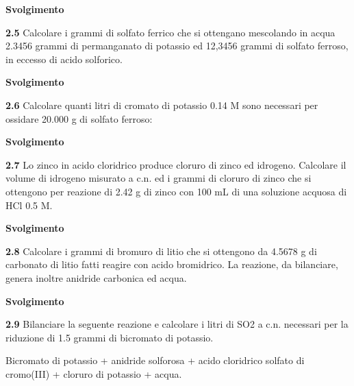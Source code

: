 \large\textbf{Svolgimento}\normalsize

\vspace{0.2cm}

\vspace{0.2cm}\textbf{2.5} Calcolare i grammi di solfato ferrico che si ottengano mescolando in acqua 2.3456 grammi di permanganato di potassio  ed 12,3456 grammi di solfato ferroso, in eccesso di acido solforico.

\large\textbf{Svolgimento}\normalsize

\vspace{0.2cm}

\vspace{0.2cm}\textbf{2.6} Calcolare quanti litri di cromato di potassio 0.14 M sono necessari per ossidare 20.000 g di solfato ferroso:
\begin{center}

\end{center}

\large\textbf{Svolgimento}\normalsize

\vspace{0.2cm}

\vspace{0.2cm}\textbf{2.7} Lo zinco in acido cloridrico produce cloruro di zinco ed idrogeno. Calcolare il volume di
idrogeno misurato a c.n. ed i grammi di cloruro di zinco che si ottengono per reazione di 2.42 g di
zinco con 100 mL di una soluzione acquosa di HCl 0.5 M.

\large\textbf{Svolgimento}\normalsize

\vspace{0.2cm}

\vspace{0.2cm}\textbf{2.8} Calcolare i grammi di bromuro di litio che si ottengono da 4.5678 g di carbonato di litio fatti
reagire con acido bromidrico. La reazione, da bilanciare, genera inoltre anidride carbonica ed acqua.

\large\textbf{Svolgimento}\normalsize

\vspace{0.2cm}

\vspace{0.2cm}\textbf{2.9} Bilanciare la seguente reazione e calcolare i litri di SO2 a c.n. necessari per la riduzione di 1.5
grammi di bicromato di potassio.

Bicromato di potassio + anidride solforosa + acido cloridrico \ce{->} solfato di cromo(III) + cloruro di
potassio + acqua.

